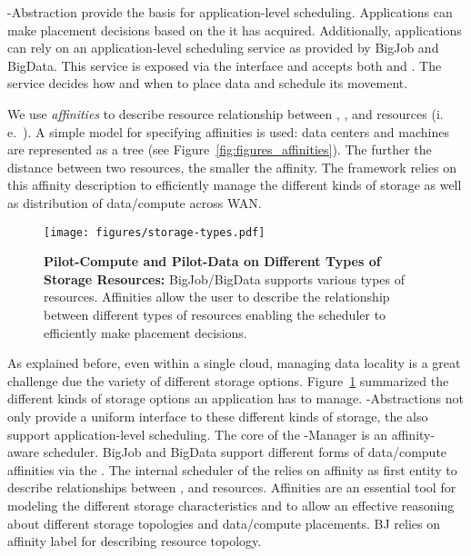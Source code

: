 \documentclass{sig-alternate}
\begin{document}
\pilot-Abstraction provide the basis for application-level scheduling.
Applications can make placement decisions based on the \pilots it has
acquired. Additionally, applications can rely on an application-level
scheduling service as provided by BigJob and BigData. This service is exposed
via the \computedataservice interface and accepts both \cus and \dus. The
service decides how and when to place data and schedule its movement. 

We use {\it affinities} to describe resource relationship between \cus, \dus,
and resources (i.\,e.\ \pilots). A simple model for specifying affinities is
used: data centers and machines are represented as a tree (see
Figure~\ref{fig:figures_affinities}). The further the distance between two
resources, the smaller the affinity. The framework relies on this affinity
description to efficiently manage the different kinds of storage as well as
distribution of data/compute across WAN.


\begin{figure}[t]
	\centering
	\texttt{[image: figures/storage-types.pdf]}
	
    \caption{\textbf{Pilot-Compute and Pilot-Data on Different
                                Types of Storage Resources:} BigJob/BigData 
				supports various types of resources. Affinities allow the user 
				to describe the 
				relationship between different types of resources enabling the 
				scheduler to efficiently make placement decisions. }
	\label{fig:figures_storage-types}
\end{figure}

As explained before, even within a single cloud, managing data locality is a
great challenge due the variety of different storage options.
Figure~\ref{fig:figures_storage-types} summarized the different kinds of
storage options an application has to manage. \pilot-Abstractions not only
provide a uniform interface to these different kinds of storage, the also
support application-level scheduling. The core of the \pilot-Manager is an
affinity-aware scheduler. BigJob and BigData support different forms of
data/compute affinities via the \computedataservice. The internal scheduler of
the \computedataservice relies on affinity as first entity to describe
relationships between \dus, \cus and resources. Affinities are an essential
tool for modeling the different storage characteristics and to allow an
effective reasoning about different storage topologies and data/compute
placements. BJ relies on affinity label for describing resource topology.
\end{document}
